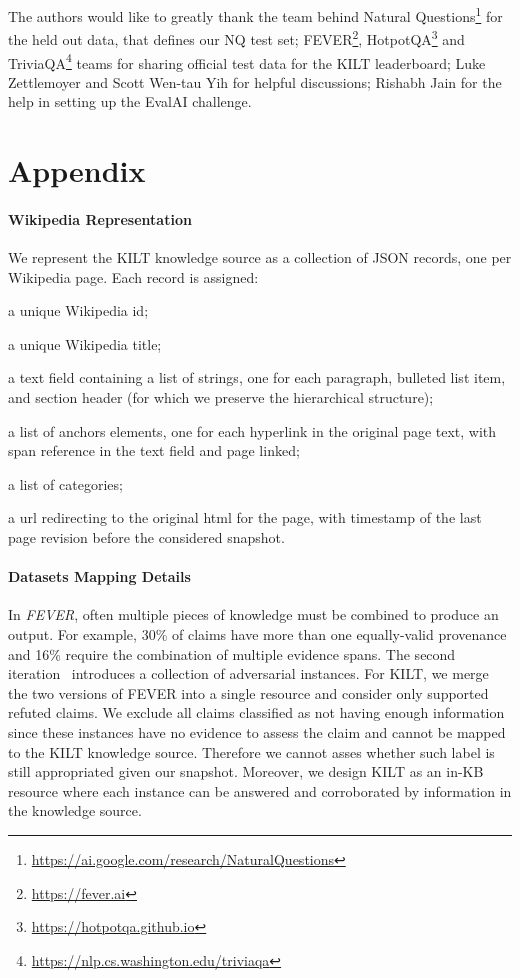 \documentclass[11pt]{article}
\begin{document}
The authors would like to greatly thank the team behind Natural Questions\footnote{\url{https://ai.google.com/research/NaturalQuestions}} for the held out data, that defines our NQ test set;  FEVER\footnote{\url{https://fever.ai}}, HotpotQA\footnote{\url{https://hotpotqa.github.io}} and TriviaQA\footnote{\url{https://nlp.cs.washington.edu/triviaqa}} teams for sharing official test data for the KILT leaderboard; Luke Zettlemoyer and Scott Wen-tau Yih for helpful discussions; Rishabh Jain for the help in setting up the EvalAI challenge. 



\clearpage
\appendix
\section{Appendix}




\paragraph{Wikipedia Representation} We represent the KILT knowledge source as a collection of JSON records, one per Wikipedia page. Each record is assigned:
\begin{enumerate*}[label=(\roman*)] 
\item a unique Wikipedia id; 
\item a unique Wikipedia title;
\item a text field containing a list of strings, one for each paragraph, bulleted list item, and section header (for which we preserve the hierarchical structure);
\item a list of anchors elements, one for each hyperlink in the original page text, with span reference in the text field and page linked;
\item a list of categories;
\item a url redirecting to the original html for the page, with timestamp of the last page revision before the considered snapshot.
\end{enumerate*}

\paragraph{Datasets Mapping Details}

In \textit{FEVER}, often multiple pieces of knowledge must be combined to produce an output. For example, 30\% of claims have more than one equally-valid provenance and 16\% require the combination of multiple evidence spans.
The second iteration~\cite[\emph{FEVER2.0},][]{thorne2019fever2} introduces a collection of  adversarial instances. For KILT, we merge the two versions of FEVER into a single resource and consider only supported refuted claims. 
We exclude all claims classified as not having enough information since these instances have no evidence to assess the claim and cannot be mapped to the KILT knowledge source. Therefore we cannot asses whether such label is still appropriated given our snapshot. Moreover, we design KILT as an in-KB resource where each instance can be answered and corroborated by information in the knowledge source.
\end{document}

